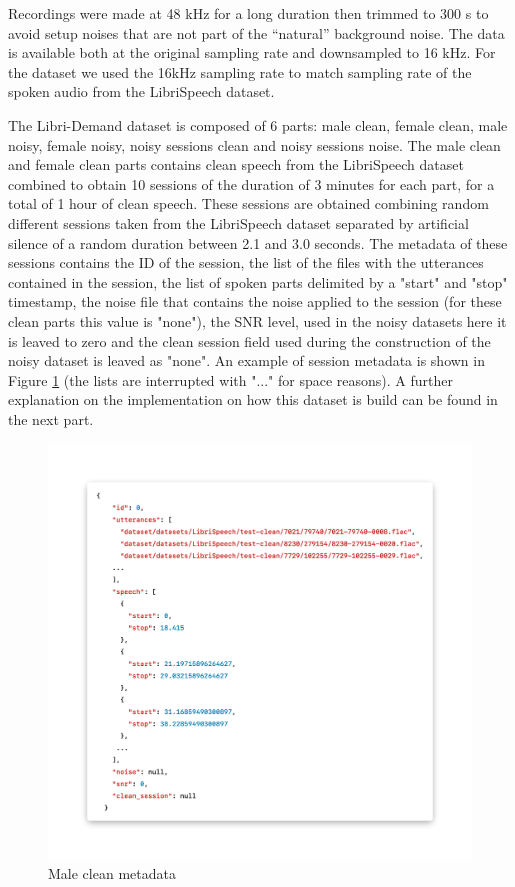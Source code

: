 \documentclass[../main.tex]{subfiles}
\begin{document}
Recordings were made at 48 kHz for a long duration then trimmed to 300 s to avoid setup noises that are not part of the “natural” background noise. The data is available both at the original sampling rate and downsampled to 16 kHz. For the dataset we used the 16kHz sampling rate to match sampling rate of the spoken audio from the LibriSpeech dataset.

The Libri-Demand dataset is composed of 6 parts: male clean, female clean, male noisy, female noisy, noisy sessions clean and noisy sessions noise. The male clean and female clean parts contains clean speech from the LibriSpeech dataset combined to obtain 10 sessions of the duration of 3 minutes for each part, for a total of 1 hour of clean speech. These sessions are obtained combining random different sessions taken from the LibriSpeech dataset separated by artificial silence of a random duration between 2.1 and 3.0 seconds. The metadata of these sessions contains the ID of the session, the list of the files with the utterances contained in the session, the list of spoken parts delimited by a "start" and "stop" timestamp, the noise file that contains the noise applied to the session (for these clean parts this value is "none"), the SNR level, used in the noisy datasets here it is leaved to zero and the clean session field used during the construction of the noisy dataset is leaved as "none". An example of session metadata is shown in Figure \ref*{fig:session_clean} (the lists are interrupted with "..." for space reasons). A further explanation on the implementation on how this dataset is build can be found in the next part.

\begin{figure}[ht]
    \centering
    \includegraphics[width=\textwidth]{images/session_clean.png}
    \caption{Male clean metadata}
    \label{fig:session_clean}
\end{figure}
\end{document}
